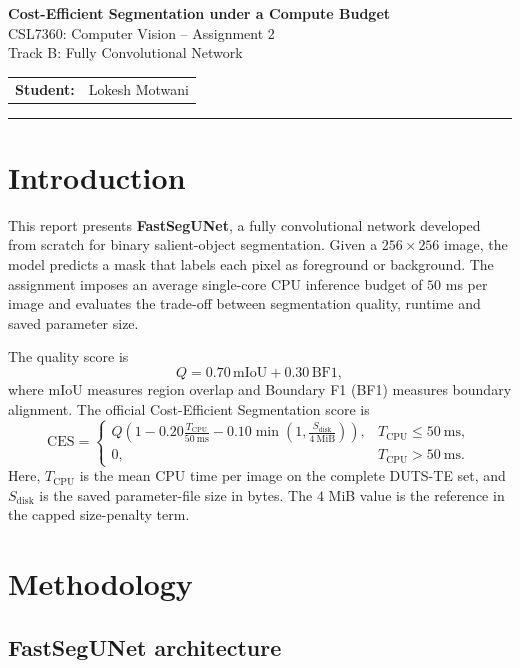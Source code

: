 \documentclass[10pt,a4paper]{article}
\newcommand{\dataset}[1]{\textsc{#1}}
\begin{document}
\begin{center}
  {\Large\bfseries\color{reportblue} Cost-Efficient Segmentation under a Compute Budget}\\[3pt]
  {\large CSL7360: Computer Vision -- Assignment 2}\\[2pt]
  {\normalsize Track B: Fully Convolutional Network}\\[8pt]
  \begin{tabular}{rl}
    \textbf{Student:} & Lokesh Motwani
  \end{tabular}
\end{center}
\vspace{2pt}
\hrule
\vspace{7pt}

\section{Introduction}

This report presents \textbf{FastSegUNet}, a fully convolutional network developed from scratch for binary salient-object segmentation. Given a $256\times256$ image, the model predicts a mask that labels each pixel as foreground or background. The assignment imposes an average single-core CPU inference budget of $50$ ms per image and evaluates the trade-off between segmentation quality, runtime and saved parameter size.

The quality score is
\[
  Q = 0.70\,\mathrm{mIoU} + 0.30\,\mathrm{BF1},
\]
where mIoU measures region overlap and Boundary F1 (BF1) measures boundary alignment. The official Cost-Efficient Segmentation score is
\[
\mathrm{CES} =
\begin{cases}
Q\left(1 - 0.20\frac{T_{\mathrm{CPU}}}{50\ \mathrm{ms}}
- 0.10\min\left(1,\frac{S_{\mathrm{disk}}}{4\ \mathrm{MiB}}\right)\right),
& T_{\mathrm{CPU}}\leq 50\ \mathrm{ms},\\[4pt]
0, & T_{\mathrm{CPU}}>50\ \mathrm{ms}.
\end{cases}
\]
Here, $T_{\mathrm{CPU}}$ is the mean CPU time per image on the complete \dataset{DUTS-TE} set, and $S_{\mathrm{disk}}$ is the saved parameter-file size in bytes. The $4$ MiB value is the reference in the capped size-penalty term.

\section{Methodology}

\subsection{FastSegUNet architecture}
\end{document}
